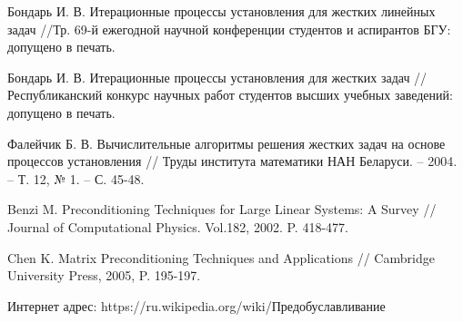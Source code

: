 \documentclass[a4paper,14pt]{extreport}
\begin{document}
\begin{thebibliography}{99}
Бондарь И. В. Итерационные процессы установления для жестких линейных задач //Тр. 69-й ежегодной научной конференции студентов и аспирантов БГУ: допущено в печать.

Бондарь И. В. Итерационные процессы установления для жестких задач //Республиканский конкурс научных работ студентов высших учебных заведений: допущено в печать.

Фалейчик Б. В. Вычислительные алгоритмы решения жестких задач на основе процессов установления // Труды института математики НАН Беларуси. -- 2004. -- Т. 12, № 1. -- С. 45-48.

Benzi M. Preconditioning Techniques for Large Linear
Systems: A Survey // Journal of Computational Physics. Vol.182, 2002. P. 418-477.

Chen K. Matrix Preconditioning Techniques and Applications // Cambridge University Press, 2005, P. 195-197.

 Интернет адрес: https://ru.wikipedia.org/wiki/Предобуславливание
\end{thebibliography}


  \appendix
\end{document}
